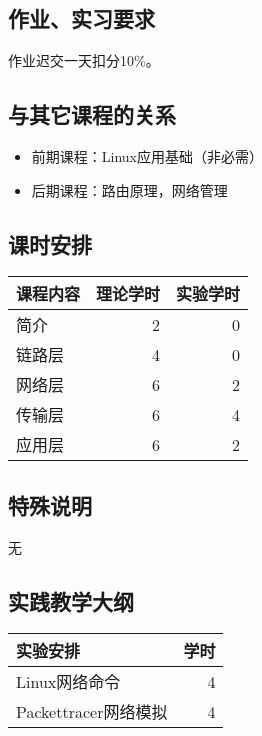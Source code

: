 \documentclass{wx672article}
\begin{document}
\subsection{作业、实习要求}

作业迟交一天扣分10\%。

\subsection{与其它课程的关系}

\begin{itemize}
\item 前期课程：Linux应用基础（非必需）
\item 后期课程：路由原理，网络管理
\end{itemize}

\subsection{课时安排}
\label{sec-2-5}

\begin{center}
  \begin{tabular}{lrr}
    \hline
    课程内容 & 理论学时 & 实验学时\\
    \hline
    简介 & 2 & 0\\
    链路层 & 4 & 0\\
    网络层 & 6 & 2\\
    传输层 & 6 & 4\\
    应用层 & 6 & 2\\
    \hline
  \end{tabular}
\end{center}

\subsection{特殊说明}
\label{sec-2-6}

无

\subsection{实践教学大纲}

\begin{center}
  \begin{tabular}{lr}
    \hline
    实验安排 & 学时\\\hline    
    Linux网络命令&4\\
    Packettracer网络模拟&4\\\hline
  \end{tabular}
\end{center}
\end{document}
